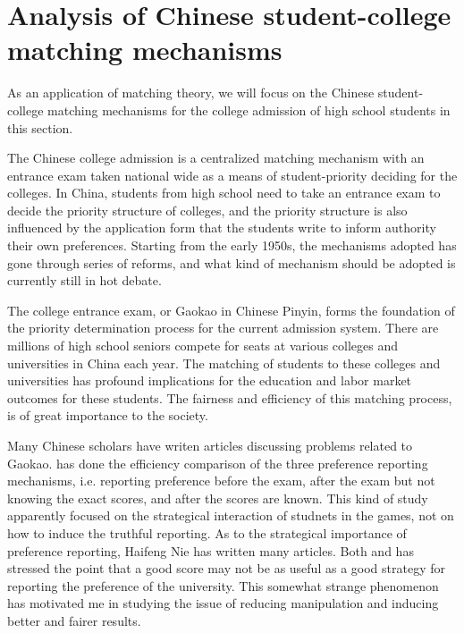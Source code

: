 



\section{Analysis of Chinese student-college matching mechanisms}

As an application of  matching theory, we will focus
on the Chinese student-college matching mechanisms for the college
admission of high school students in this section.

The Chinese college admission is a centralized matching mechanism with
an entrance exam taken national wide as a means of student-priority
deciding for the colleges.
In China, students from high school need to take an entrance exam to
decide the priority structure of colleges, and the priority structure
is also influenced by the application form that the students write to
inform authority their own preferences. Starting from the early 1950s,
the mechanisms adopted has gone
through series of reforms,  and what kind of mechanism should be adopted is
currently still in hot debate.

The college entrance exam, or Gaokao in Chinese Pinyin,  forms the 
foundation of the priority determination process for the current
admission system.  There are millions of high school seniors compete
for  seats at various colleges and universities in China each
year. The matching of students to these colleges and universities has
profound implications for the education and labor market outcomes for
these students.  The fairness and efficiency of this matching process,
is of great importance to the society.

Many Chinese scholars have writen articles discussing problems related
to Gaokao. \parencite{Zhong2004} has done the efficiency comparison of
the three preference reporting  mechanisms, i.e. reporting preference
before the exam, after the exam but not knowing the exact scores,  and
after
the scores are known.  This kind of study apparently focused on the
strategical interaction of studnets in the games, not on how to induce
the truthful reporting.  As to the strategical importance of
preference reporting,  Haifeng Nie has written many articles.  Both \parencite{Nie2007a}
and \parencite{Nie2007b} has stressed the point that a good score may
not be as useful as a good strategy for reporting the preference of
the university. This somewhat strange phenomenon has motivated me
in studying the issue of reducing manipulation and inducing better
and fairer results.

